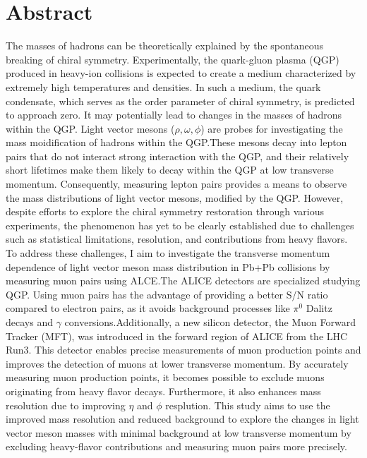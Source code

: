 \section*{Abstract}
The masses of hadrons can be theoretically explained by the spontaneous breaking of chiral symmetry. Experimentally, the quark-gluon plasma (QGP) produced in heavy-ion collisions is expected to create a medium characterized by extremely high temperatures and densities. In such a medium, the quark condensate, which serves as the order parameter of chiral symmetry, is predicted to approach zero. It may potentially lead to changes in the masses of hadrons within the QGP.\@
Light vector mesons ($\rho, \omega, \phi$) are  probes for investigating the mass moidification of hadrons within the QGP.\@ These mesons decay into lepton pairs that do not interact strong interaction with the QGP, and their relatively short lifetimes make them likely to decay within the QGP at low transverse momentum. Consequently, measuring lepton pairs provides a means to observe the mass distributions of light vector mesons, modified by the QGP.\@
However, despite efforts to explore the chiral symmetry restoration through various experiments, the phenomenon has yet to be clearly established due to challenges such as statistical limitations, resolution, and contributions from heavy flavors. To address these challenges, I aim to investigate the transverse momentum dependence of light vector meson mass distribution in Pb+Pb collisions by measuring muon pairs using ALCE.\@ The ALICE detectors are specialized studying QGP.\@
Using muon pairs has the advantage of providing a better S/N ratio compared to electron pairs, as it avoids background processes like $\pi^0$ Dalitz decays and $\gamma$ conversions.\@ Additionally, a new silicon detector, the Muon Forward Tracker (MFT), was introduced in the forward region of ALICE from the LHC Run3.\@
This detector enables precise measurements of muon production points and improves the detection of muons at lower transverse momentum. By accurately measuring muon production points, it becomes possible to exclude muons originating from heavy flavor decays. Furthermore, it also enhances mass resolution due to improving $\eta$ and $\phi$ resplution.
This study aims to use the improved mass resolution and reduced background to explore the changes in light vector meson masses with minimal background at low transverse momentum by excluding heavy-flavor contributions and measuring muon pairs more precisely.

